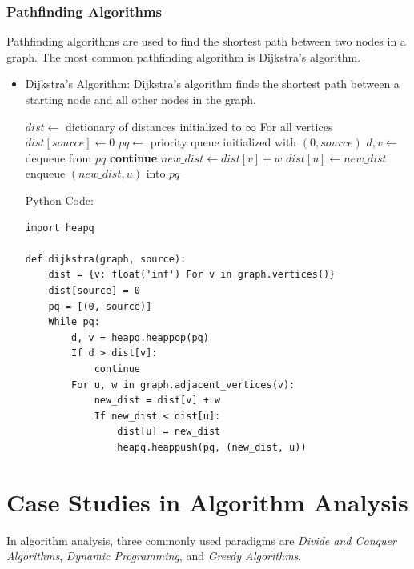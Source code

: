 \documentclass[12pt]{book} %
\begin{document}
\FloatBarrier %
\subsubsection{Pathfinding Algorithms}

Pathfinding algorithms are used to find the shortest path between two nodes in a graph. The most common pathfinding algorithm is Dijkstra's algorithm.
\FloatBarrier %
\begin{itemize}
\item Dijkstra's Algorithm:
Dijkstra's algorithm finds the shortest path between a starting node and all other nodes in the graph. 
\FloatBarrier %
\begin{algorithm}
\caption{Dijkstra's Algorithm}
\begin{algorithmic}[1]
    \State $dist \gets$ dictionary of distances initialized to $\infty$ For all vertices
    \State $dist[source] \gets 0$
    \State $pq \gets$ priority queue initialized with $(0, source)$
        \State $d, v \gets$ dequeue from $pq$
            \State \textbf{continue}
        \EndIf
            \State $new\_dist \gets dist[v] + w$
                \State $dist[u] \gets new\_dist$
                \State enqueue $(new\_dist, u)$ into $pq$
            \EndIf
        \EndFor
    \EndWhile
\EndFunction
\end{algorithmic}
\end{algorithm}
\FloatBarrier
Python Code:
\FloatBarrier
\begin{verbatim}
import heapq

def dijkstra(graph, source):
    dist = {v: float('inf') For v in graph.vertices()}
    dist[source] = 0
    pq = [(0, source)]
    While pq:
        d, v = heapq.heappop(pq)
        If d > dist[v]:
            continue
        For u, w in graph.adjacent_vertices(v):
            new_dist = dist[v] + w
            If new_dist < dist[u]:
                dist[u] = new_dist
                heapq.heappush(pq, (new_dist, u))
\end{verbatim}
\end{itemize}
\FloatBarrier %

\section{Case Studies in Algorithm Analysis}
In algorithm analysis, three commonly used paradigms are \textit{Divide and Conquer Algorithms}, \textit{Dynamic Programming}, and \textit{Greedy Algorithms}.
\end{document}

